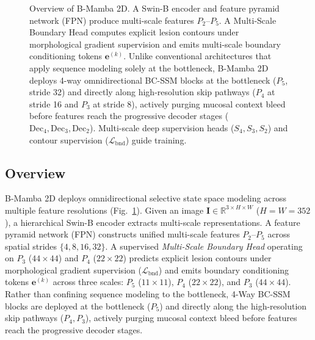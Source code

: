 \documentclass[journal]{IEEEtran}
\newcommand{\R}{\mathbb{R}}
\newcommand{\vect}[1]{\bm{#1}}
\begin{document}
\begin{figure}[t]
{}
\caption{Overview of B-Mamba 2D. A Swin-B encoder and feature pyramid network (FPN) produce multi-scale features $P_2$--$P_5$. A Multi-Scale Boundary Head computes explicit lesion contours under morphological gradient supervision and emits multi-scale boundary conditioning tokens $\vect{e}^{(k)}$. Unlike conventional architectures that apply sequence modeling solely at the bottleneck, B-Mamba 2D deploys 4-way omnidirectional BC-SSM blocks at the bottleneck ($P_5$, stride 32) and directly along high-resolution skip pathways ($P_4$ at stride 16 and $P_3$ at stride 8), actively purging mucosal context bleed before features reach the progressive decoder stages ($\text{Dec}_4, \text{Dec}_3, \text{Dec}_2$). Multi-scale deep supervision heads ($S_4, S_3, S_2$) and contour supervision ($\mathcal{L}_{\text{bnd}}$) guide training.}
\label{fig:arch}
\end{figure}

\subsection{Overview}
B-Mamba 2D deploys omnidirectional selective state space modeling across multiple feature resolutions (Fig.~\ref{fig:arch}). Given an image $\vect{I}\in\R^{3\times H\times W}$ ($H=W=352$), a hierarchical Swin-B encoder extracts multi-scale representations. A feature pyramid network (FPN) constructs unified multi-scale features $P_2$--$P_5$ across spatial strides $\{4, 8, 16, 32\}$. A supervised \emph{Multi-Scale Boundary Head} operating on $P_3$ ($44\times44$) and $P_4$ ($22\times22$) predicts explicit lesion contours under morphological gradient supervision ($\mathcal{L}_{\text{bnd}}$) and emits boundary conditioning tokens $\vect{e}^{(k)}$ across three scales: $P_5$ ($11\times11$), $P_4$ ($22\times22$), and $P_3$ ($44\times44$). Rather than confining sequence modeling to the bottleneck, 4-Way BC-SSM blocks are deployed at the bottleneck ($P_5$) and directly along the high-resolution skip pathways ($P_4, P_3$), actively purging mucosal context bleed before features reach the progressive decoder stages.
\end{document}
